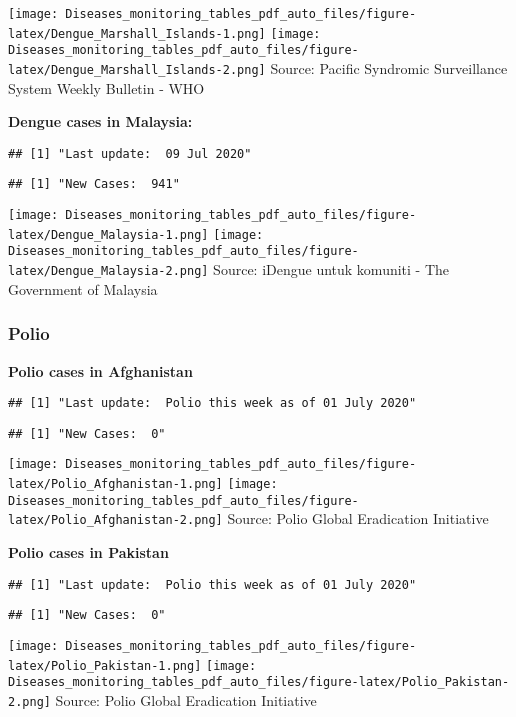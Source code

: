 \documentclass[]{article}
\begin{document}
\texttt{[image: Diseases\_monitoring\_tables\_pdf\_auto\_files/figure-latex/Dengue\_Marshall\_Islands-1.png]}
\texttt{[image: Diseases\_monitoring\_tables\_pdf\_auto\_files/figure-latex/Dengue\_Marshall\_Islands-2.png]}
Source: Pacific Syndromic Surveillance System Weekly Bulletin - WHO
\pagebreak

\textbf{Dengue cases in Malaysia:}

\begin{verbatim}
## [1] "Last update:  09 Jul 2020"
\end{verbatim}

\begin{verbatim}
## [1] "New Cases:  941"
\end{verbatim}

\texttt{[image: Diseases\_monitoring\_tables\_pdf\_auto\_files/figure-latex/Dengue\_Malaysia-1.png]}
\texttt{[image: Diseases\_monitoring\_tables\_pdf\_auto\_files/figure-latex/Dengue\_Malaysia-2.png]}
Source: iDengue untuk komuniti - The Government of Malaysia \pagebreak

\hypertarget{polio}{%
\subsubsection{Polio}\label{polio}}

\textbf{Polio cases in Afghanistan}

\begin{verbatim}
## [1] "Last update:  Polio this week as of 01 July 2020"
\end{verbatim}

\begin{verbatim}
## [1] "New Cases:  0"
\end{verbatim}

\texttt{[image: Diseases\_monitoring\_tables\_pdf\_auto\_files/figure-latex/Polio\_Afghanistan-1.png]}
\texttt{[image: Diseases\_monitoring\_tables\_pdf\_auto\_files/figure-latex/Polio\_Afghanistan-2.png]}
Source: Polio Global Eradication Initiative

\pagebreak

\textbf{Polio cases in Pakistan}

\begin{verbatim}
## [1] "Last update:  Polio this week as of 01 July 2020"
\end{verbatim}

\begin{verbatim}
## [1] "New Cases:  0"
\end{verbatim}

\texttt{[image: Diseases\_monitoring\_tables\_pdf\_auto\_files/figure-latex/Polio\_Pakistan-1.png]}
\texttt{[image: Diseases\_monitoring\_tables\_pdf\_auto\_files/figure-latex/Polio\_Pakistan-2.png]}
Source: Polio Global Eradication Initiative \pagebreak
\end{document}
